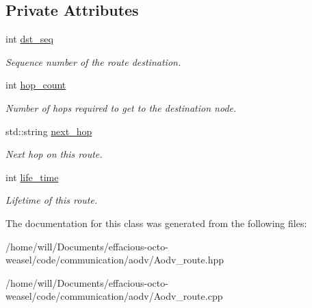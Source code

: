 \subsection*{Private Attributes}
\begin{DoxyCompactItemize}
\item 
int \hyperlink{class_aodv__route_a6181d78c70313a943c3875650f6b5034}{dst\+\_\+seq}\hypertarget{class_aodv__route_a6181d78c70313a943c3875650f6b5034}{}\label{class_aodv__route_a6181d78c70313a943c3875650f6b5034}

\begin{DoxyCompactList}\small\item\em Sequence number of the route destination. \end{DoxyCompactList}\item 
int \hyperlink{class_aodv__route_a5091dac0edb94ffbce78b570c9476583}{hop\+\_\+count}\hypertarget{class_aodv__route_a5091dac0edb94ffbce78b570c9476583}{}\label{class_aodv__route_a5091dac0edb94ffbce78b570c9476583}

\begin{DoxyCompactList}\small\item\em Number of hops required to get to the destination node. \end{DoxyCompactList}\item 
std\+::string \hyperlink{class_aodv__route_abb6560ab9abb3445562173383963358f}{next\+\_\+hop}\hypertarget{class_aodv__route_abb6560ab9abb3445562173383963358f}{}\label{class_aodv__route_abb6560ab9abb3445562173383963358f}

\begin{DoxyCompactList}\small\item\em Next hop on this route. \end{DoxyCompactList}\item 
int \hyperlink{class_aodv__route_a6d1c7cca7009b97d3950e29708b980d4}{life\+\_\+time}\hypertarget{class_aodv__route_a6d1c7cca7009b97d3950e29708b980d4}{}\label{class_aodv__route_a6d1c7cca7009b97d3950e29708b980d4}

\begin{DoxyCompactList}\small\item\em Lifetime of this route. \end{DoxyCompactList}\end{DoxyCompactItemize}


The documentation for this class was generated from the following files\+:\begin{DoxyCompactItemize}
\item 
/home/will/\+Documents/effacious-\/octo-\/weasel/code/communication/aodv/Aodv\+\_\+route.\+hpp\item 
/home/will/\+Documents/effacious-\/octo-\/weasel/code/communication/aodv/Aodv\+\_\+route.\+cpp\end{DoxyCompactItemize}
